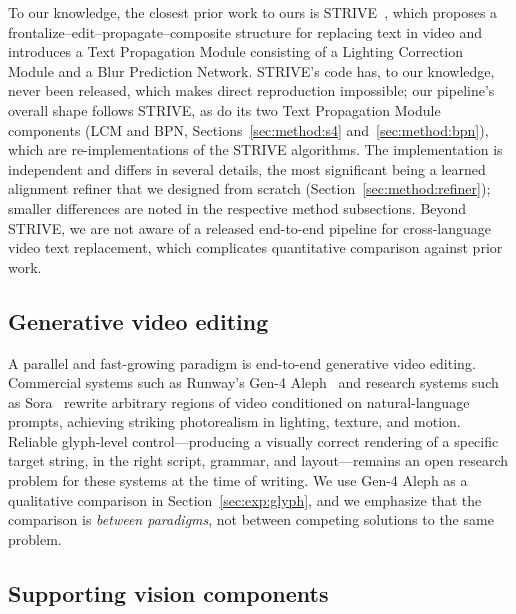 To our knowledge, the closest prior work to ours is
STRIVE~\citep{subramanian2021strive}, which proposes a
frontalize--edit--propagate--composite structure for replacing text
in video and introduces a Text Propagation Module consisting of a
Lighting Correction Module and a Blur Prediction Network. STRIVE's
code has, to our knowledge, never been released, which makes direct
reproduction impossible; our pipeline's overall shape follows
STRIVE, as do its two Text Propagation Module components (LCM and
BPN, Sections~\ref{sec:method:s4} and~\ref{sec:method:bpn}), which
are re-implementations of the STRIVE algorithms. The implementation
is independent and differs in several details, the most significant
being a learned alignment refiner that we designed from scratch
(Section~\ref{sec:method:refiner}); smaller differences are noted
in the respective method subsections.
Beyond STRIVE, we are not aware of a released end-to-end pipeline
for cross-language video text replacement, which complicates
quantitative comparison against prior work.

\subsection{Generative video editing}
\label{sec:related:generative}

A parallel and fast-growing paradigm is end-to-end generative video
editing. Commercial systems such as Runway's Gen-4
Aleph~\citep{runway2025aleph} and research systems such as
Sora~\citep{openai2024sora} rewrite arbitrary regions of video
conditioned on natural-language prompts, achieving striking
photorealism in lighting, texture, and motion. Reliable glyph-level
control---producing a visually correct rendering of a specific
target string, in the right script, grammar, and layout---remains an
open research problem for these systems at the time of writing. We
use Gen-4 Aleph as a qualitative comparison in
Section~\ref{sec:exp:glyph}, and we emphasize that the
comparison is \emph{between paradigms}, not between competing
solutions to the same problem.

\subsection{Supporting vision components}
\label{sec:related:support}

